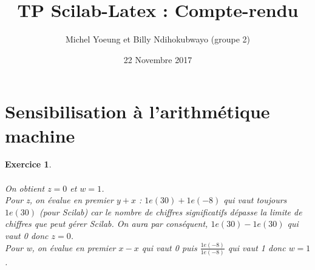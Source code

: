 \documentclass[a4paper,11pt]{article}
\title{TP Scilab-Latex : Compte-rendu}
\author{Michel Yoeung et Billy Ndihokubwayo (groupe 2)}
\date{22 Novembre 2017}
\newtheorem{exo}{Exercice}
\begin{document}
\maketitle

\section{Sensibilisation à l'arithmétique machine}

\begin{exo} \ \\ \\
On obtient $ z=0 $ et $ w=1 $. \\
Pour z, on évalue en premier $ y+x $ : $ 1e(30)+1e(-8) $ qui vaut toujours $ 1e(30) $ (pour Scilab) car le nombre de chiffres significatifs dépasse la limite de chiffres que peut gérer Scilab. On aura par conséquent, $ 1e(30)-1e(30) $ qui vaut 0 donc $ z=0 $. \\
Pour w, on évalue en premier $ x-x $ qui vaut 0 puis $ \frac{1e(-8)}{1e(-8)} $ qui vaut 1 donc $ w=1 $.
\end{exo}
\end{document}
